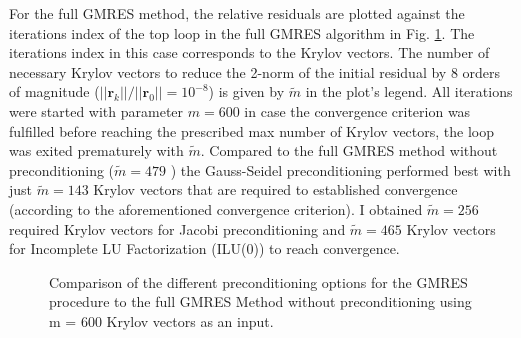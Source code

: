 \documentclass[11pt,a4paper]{article}
\newcommand{\refFig}[1]{Fig. \ref{#1}}
\begin{document}
For the full GMRES method, the relative residuals are plotted against the iterations index of the top loop in the full GMRES algorithm in \refFig{fig::Residuals}. The iterations index in this case corresponds to the Krylov vectors. The number of necessary Krylov vectors to reduce the 2-norm of the initial residual by 8 orders of magnitude ($||\mathbf{r}_k|| / ||\mathbf{r}_0|| = 10^{-8}$) is given by $\tilde{m}$ in the plot's legend. All iterations were started with parameter $m = 600$ in case the convergence criterion was fulfilled before reaching the prescribed max number of Krylov vectors, the loop was exited prematurely with $\tilde{m}$. Compared to the full GMRES method without preconditioning ($\tilde{m} = 479$ ) the Gauss-Seidel preconditioning performed best with just $\tilde{m} = 143$ Krylov vectors that are required to established convergence (according to the aforementioned convergence criterion). I obtained $\tilde{m} = 256$ required Krylov vectors for Jacobi preconditioning and $\tilde{m} = 465$ Krylov vectors for Incomplete LU Factorization (ILU(0)) to reach convergence.
%
\begin{figure}[!htbp]
	\centering
	\hspace*{0.8cm}
	\leavevmode
	\resizebox{0.82\width}{!}{}
	\caption{Comparison of the different preconditioning options for the GMRES procedure to the full GMRES Method without preconditioning using m = 600 Krylov vectors as an input.}
	\label{fig::Residuals}
\end{figure}
%
\end{document}
